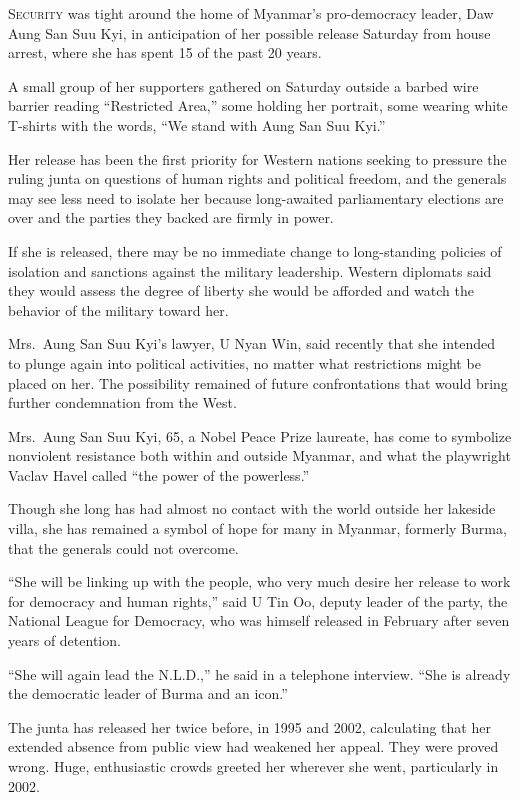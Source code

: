 ﻿\documentclass[12pt]{article}
\begin{document}
\lettrine{S}{ecurity} was tight around the home of Myanmar's pro-democracy
leader, Daw Aung San Suu Kyi, in anticipation of her possible release Saturday from house arrest,
where she has spent 15 of the past 20 years.

A small group of her supporters gathered on Saturday outside a barbed wire barrier reading
``Restricted Area,'' some holding her portrait, some wearing white T-shirts with the words, ``We
stand with Aung San Suu Kyi.''

Her release has been the first priority for Western nations seeking to pressure the ruling junta on
questions of human rights and political freedom, and the generals may see less need to isolate her
because long-awaited parliamentary elections are over and the parties they backed are firmly in
power.

If she is released, there may be no immediate change to long-standing policies of isolation and
sanctions against the military leadership. Western diplomats said they would assess the degree of
liberty she would be afforded and watch the behavior of the military toward her.

Mrs.~Aung San Suu Kyi's lawyer, U Nyan Win, said recently that she intended to plunge again into
political activities, no matter what restrictions might be placed on her. The possibility remained
of future confrontations that would bring further condemnation from the West.

Mrs.~Aung San Suu Kyi, 65, a Nobel Peace Prize laureate, has come to symbolize nonviolent resistance
both within and outside Myanmar, and what the playwright Vaclav Havel called ``the power of the
powerless.''

Though she long has had almost no contact with the world outside her lakeside villa, she has
remained a symbol of hope for many in Myanmar, formerly Burma, that the generals could not overcome.

``She will be linking up with the people, who very much desire her release to work for democracy and
human rights,'' said U Tin Oo, deputy leader of the party, the National League for Democracy, who
was himself released in February after seven years of detention.

``She will again lead the N.L.D.,'' he said in a telephone interview. ``She is already the
democratic leader of Burma and an icon.''

The junta has released her twice before, in 1995 and 2002, calculating that her extended absence
from public view had weakened her appeal. They were proved wrong. Huge, enthusiastic crowds greeted
her wherever she went, particularly in 2002.
\end{document}
